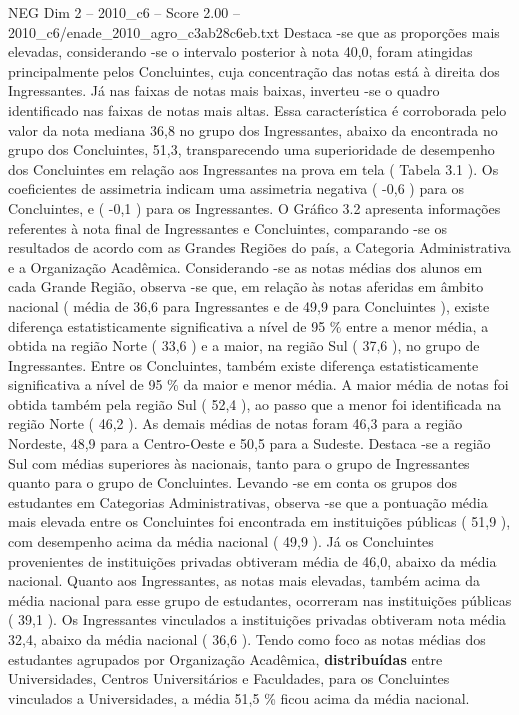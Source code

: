 \begin{textsample}{NEG Dim 2 – 2010\_c6 – Score 2.00 – 2010\_c6/enade\_2010\_agro\_c3ab28c6eb.txt}
Destaca -se que as proporções mais elevadas, considerando -se o intervalo posterior à nota 40,0, foram atingidas principalmente pelos Concluintes, cuja concentração das notas está à direita dos Ingressantes.
Já nas faixas de notas mais baixas, inverteu -se o quadro identificado nas faixas de notas mais altas.
Essa característica é corroborada pelo valor da nota mediana 36,8 no grupo dos Ingressantes, abaixo da encontrada no grupo dos Concluintes, 51,3, transparecendo uma superioridade de desempenho dos Concluintes em relação aos Ingressantes na prova em tela ( Tabela 3.1 ).
Os coeficientes de assimetria indicam uma assimetria negativa ( -0,6 ) para os Concluintes, e ( -0,1 ) para os Ingressantes.
O Gráfico 3.2 apresenta informações referentes à nota final de Ingressantes e Concluintes, comparando -se os resultados de acordo com as Grandes Regiões do país, a Categoria Administrativa e a Organização Acadêmica.
Considerando -se as notas médias dos alunos em cada Grande Região, observa -se que, em relação às notas aferidas em âmbito nacional ( média de 36,6 para Ingressantes e de 49,9 para Concluintes ), existe diferença estatisticamente significativa a nível de 95 \% entre a menor média, a obtida na região Norte ( 33,6 ) e a maior, na região Sul ( 37,6 ), no grupo de Ingressantes.
Entre os Concluintes, também existe diferença estatisticamente significativa a nível de 95 \% da maior e menor média.
A maior média de notas foi obtida também pela região Sul ( 52,4 ), ao passo que a menor foi identificada na região Norte ( 46,2 ).
As demais médias de notas foram 46,3 para a região Nordeste, 48,9 para a Centro-Oeste e 50,5 para a Sudeste.
Destaca -se a região Sul com médias superiores às nacionais, tanto para o grupo de Ingressantes quanto para o grupo de Concluintes.
Levando -se em conta os grupos dos estudantes em Categorias Administrativas, observa -se que a pontuação média mais elevada entre os Concluintes foi encontrada em instituições públicas ( 51,9 ), com desempenho acima da média nacional ( 49,9 ).
Já os Concluintes provenientes de instituições privadas obtiveram média de 46,0, abaixo da média nacional.
Quanto aos Ingressantes, as notas mais elevadas, também acima da média nacional para esse grupo de estudantes, ocorreram nas instituições públicas ( 39,1 ).
Os Ingressantes vinculados a instituições privadas obtiveram nota média 32,4, abaixo da média nacional ( 36,6 ).
Tendo como foco as notas médias dos estudantes agrupados por Organização Acadêmica, \textbf{distribuídas} entre Universidades, Centros Universitários e Faculdades, para os Concluintes vinculados a Universidades, a média 51,5 \% ficou acima da média nacional.

\end{textsample}
